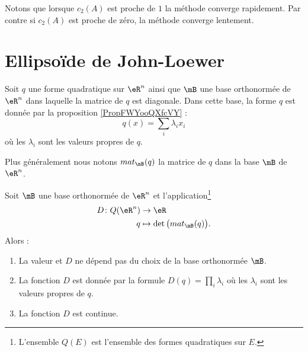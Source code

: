 Notons que lorsque \( c_2(A)\) est proche de \( 1\) la méthode converge rapidement. Par contre si \( c_2(A)\) est proche de zéro, la méthode converge lentement.

\section{Ellipsoïde de John-Loewer}

Soit \( q\) une forme quadratique sur \( \eR^n\) ainsi que \( \mB\) une base orthonormée de \( \eR^n\) dans laquelle la matrice de  \( q\) est diagonale. Dans cette base, la forme \( q\) est donnée par la proposition \ref{PropFWYooQXfcVY} :
\begin{equation}
    q(x)=\sum_i\lambda_ix_i
\end{equation}
où les \( \lambda_i\) sont les valeurs propres de \( q\).

Plus généralement nous notons \( mat_{\mB}(q)\) la matrice de \( q\) dans la base \( \mB\) de \( \eR^n\).

\begin{proposition} \label{PropOXWooYrDKpw}
    Soit \( \mB\) une base orthonormée de \( \eR^n\) et l'application\footnote{L'ensemble \( Q(E)\) est l'ensemble des formes quadratiques sur \( E\).}
    \begin{equation}
        \begin{aligned}
            D\colon Q(\eR^n)&\to \eR \\
            q&\mapsto \det\big( mat_{\mB}(q) \big) .
        \end{aligned}
    \end{equation}
    Alors :
    \begin{enumerate}
        \item
            La valeur et \( D\) ne dépend pas du choix de la base orthonormée \( \mB\).
        \item
            La fonction \( D\) est donnée par la formule \( D(q)=\prod_i\lambda_i\) où les \( \lambda_i\) sont les valeurs propres de \( q\).
        \item
            La fonction \( D\) est continue.
    \end{enumerate}
\end{proposition}

